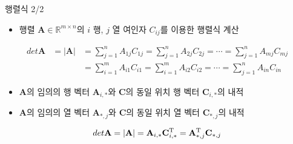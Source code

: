 \documentclass{beamer}
\begin{document}
\begin{frame}{행렬식 2/2}

\begin{itemize}
\item 행렬 $\mathbf A \in \mathbb R^{m \times n}$의 $i$ 행, $j$ 열 여인자 $C_{ij}$를 이용한 행렬식 계산
\end{itemize}
\begin{eqnarray}
det \mathbf A &= | \mathbf A | &= \sum_{j=1}^n A_{1j} C_{1j} = \sum_{j=1}^n A_{2j} C_{2j} = \cdots = \sum_{j=1}^n A_{mj} C_{mj} \\ \nonumber
& &= \sum_{i=1}^m A_{i1} C_{i1} = \sum_{i=1}^m A_{i2} C_{i2} = \cdots = \sum_{j=1}^n A_{in} C_{in} 
\end{eqnarray}

\begin{itemize}
\item $\mathbf A$의 임의의 행 벡터 $\mathbf A_{i,*}$와 $\mathbf C$의 동일 위치 행 벡터 $\mathbf C_{i,*}$의 내적
\item $\mathbf A$의 임의의 열 벡터 $\mathbf A_{*,j}$와 $\mathbf C$의 동일 위치 열 벡터 $\mathbf C_{*,j}$의 내적
\end{itemize}

\begin{eqnarray}
det \mathbf A = | \mathbf A | = \mathbf A_{i,*} \mathbf C_{i,*}^{\rm T} = \mathbf A_{*,j}^{\rm T} \mathbf C_{*,j}
\end{eqnarray}

\end{frame}
\end{document}

